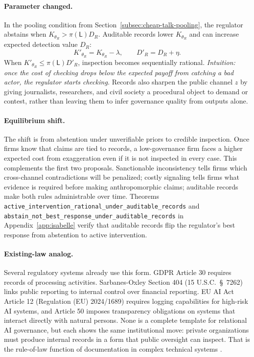 \paragraph{Parameter changed.}
In the pooling condition from Section~\ref{subsec:cheap-talk-pooling}, the
regulator abstains when $K_{\theta_R}>\pi(\mathsf{L})D_R$. Auditable records
lower $K_{\theta_R}$ and can increase expected detection value $D_R$:
\[
K'_{\theta_R}=K_{\theta_R}-\lambda,\qquad
D'_R=D_R+\eta .
\]
When $K'_{\theta_R}\leq \pi(\mathsf{L})D'_R$, inspection becomes sequentially
rational.
\emph{Intuition: once the cost of checking drops below the expected payoff from catching a bad actor, the regulator starts checking.}
Records also sharpen the public channel $z$ by giving journalists,
researchers, and civil society a procedural object to demand or contest, rather
than leaving them to infer governance quality from outputs alone.

\paragraph{Equilibrium shift.}
The shift is from abstention under unverifiable priors to credible inspection.
Once firms know that claims are tied to records, a low-governance firm faces a
higher expected cost from exaggeration even if it is not inspected in every
case. This complements the first two proposals. Sanctionable inconsistency tells
firms which cross-channel contradictions will be penalized; costly signaling
tells firms what evidence is required before making anthropomorphic claims;
auditable records make both rules administrable over time. Theorems \texttt{active\_\allowbreak{}intervention\_\allowbreak{}rational\_\allowbreak{}under\_\allowbreak{}auditable\_\allowbreak{}records} and \texttt{abstain\_\allowbreak{}not\_\allowbreak{}best\_\allowbreak{}response\_\allowbreak{}under\_\allowbreak{}auditable\_\allowbreak{}records} in Appendix~\ref{app:isabelle} verify that auditable records flip the regulator's best response from abstention to active intervention.

\paragraph{Existing-law analog.}
Several regulatory systems already use this form. GDPR Article 30 requires
records of processing activities. Sarbanes-Oxley Section 404 (15 U.S.C.\ \S~7262) links public
reporting to internal control over financial reporting. EU AI Act Article 12
(Regulation (EU) 2024/1689) requires logging capabilities for high-risk AI systems,
and Article 50 imposes transparency obligations on systems that interact directly with
natural persons. None is a complete
template for relational AI governance, but each shows the same institutional
move: private organizations must produce internal records in a form that public
oversight can inspect. That is the rule-of-law function of documentation in
complex technical systems \citep{hadfield2017rules}.

